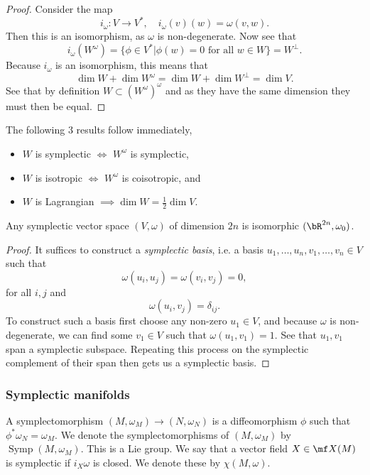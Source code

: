 \begin{proof}
    Consider the map
    \[i_\omega:V\to V^*,\quad i_\omega(v)(w)=\omega(v,w).\]
    Then this is an isomorphism, as $\omega$ is non-degenerate.
    Now see that
    \[i_\omega(W^\omega)=\{\phi\in V^*|\phi(w)=0\text{ for all }w\in W\}=W^\perp.\]
    Because $i_\omega$ is an isomorphism, this means that
    \[\dim W+\dim W^\omega=\dim W+\dim W^\perp=\dim V.\]
    See that by definition $W\subset(W^\omega)^\omega$ and as they have the same dimension they must then be equal.
\end{proof}

\begin{cor}
The following $3$ results follow immediately,
\begin{itemize}
    \item $W$ is symplectic $\iff$ $W^\omega$ is symplectic,
    \item $W$ is isotropic $\iff$ $W^\omega$ is coisotropic, and
    \item $W$ is Lagrangian $\implies\dim W=\frac12\dim V$.
\end{itemize}
\end{cor}

\begin{thm}
    Any symplectic vector space $(V,\omega)$ of dimension $2n$ is isomorphic $(\bR^{2n},\omega_0)$.
\end{thm}

\begin{proof}
    It suffices to construct a \emph{symplectic basis}, i.e. a basis $u_1,\ldots,u_n,v_1,\ldots,v_n\in V$ such that
    \[\omega(u_i,u_j)=\omega(v_i,v_j)=0,\]
    for all $i,j$ and
    \[\omega(u_i,v_j)=\delta_{ij}.\]
    To construct such a basis first choose any non-zero $u_1\in V$, and because $\omega$ is non-degenerate, we can find some $v_1\in V$ such that $\omega(u_1,v_1)=1$.
    See that $u_1,v_1$ span a symplectic subspace.
    Repeating this process on the symplectic complement of their span then gets us a symplectic basis.
\end{proof}

\subsubsection*{Symplectic manifolds}
\begin{dfn}
    A symplectomorphism $(M,\omega_M)\to(N,\omega_N)$ is a diffeomorphism $\phi$ such that $\phi^*\omega_N=\omega_M$.
    We denote the symplectomorphisms of $(M,\omega_M)$ by $\operatorname{Symp}(M,\omega_M)$.
    This is a Lie group.
    We say that a vector field $X\in\mf X(M)$ is symplectic if $i_X\omega$ is closed.
    We denote these  by $\chi(M,\omega)$.
\end{dfn}

